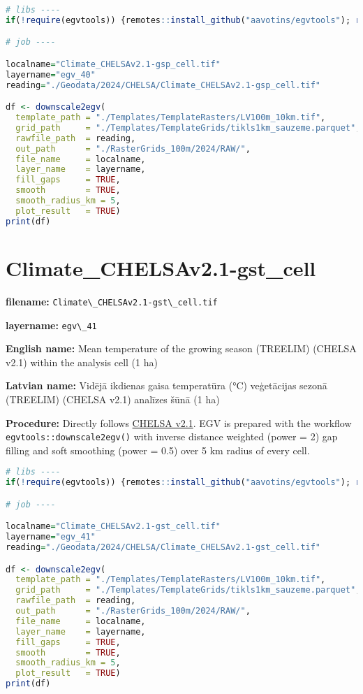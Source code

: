 \documentclass[
]{book}
\newcommand{\passthrough}[1]{#1}
\begin{document}
\begin{lstlisting}[language=R]
# libs ----
if(!require(egvtools)) {remotes::install_github("aavotins/egvtools"); require(egvtools)}

# job ----

localname="Climate_CHELSAv2.1-gsp_cell.tif"
layername="egv_40"
reading="./Geodata/2024/CHELSA/Climate_CHELSAv2.1-gsp_cell.tif"

df <- downscale2egv(
  template_path = "./Templates/TemplateRasters/LV100m_10km.tif",
  grid_path     = "./Templates/TemplateGrids/tikls1km_sauzeme.parquet",
  rawfile_path  = reading,
  out_path      = "./RasterGrids_100m/2024/RAW/",
  file_name     = localname,
  layer_name    = layername,
  fill_gaps     = TRUE,
  smooth        = TRUE,
  smooth_radius_km = 5,
  plot_result   = TRUE)
print(df)
\end{lstlisting}

\section{Climate\_CHELSAv2.1-gst\_cell}\label{ch06.041}

\textbf{filename:} \passthrough{\lstinline!Climate\_CHELSAv2.1-gst\_cell.tif!}

\textbf{layername:} \passthrough{\lstinline!egv\_41!}

\textbf{English name:} Mean temperature of the growing season (TREELIM) (CHELSA v2.1) within the analysis cell (1 ha)

\textbf{Latvian name:} Vidējā ikdienas gaisa temperatūra (°C) veģetācijas sezonā (TREELIM) (CHELSA v2.1) analīzes šūnā (1 ha)

\textbf{Procedure:} Directly follows \hyperref[Ch04.11]{CHELSA v2.1}. EGV is prepared with the
workflow \passthrough{\lstinline!egvtools::downscale2egv()!} with inverse distance weighted (power = 2)
gap filling and soft smoothing (power = 0.5) over 5 km radius of every cell.

\begin{lstlisting}[language=R]
# libs ----
if(!require(egvtools)) {remotes::install_github("aavotins/egvtools"); require(egvtools)}

# job ----

localname="Climate_CHELSAv2.1-gst_cell.tif"
layername="egv_41"
reading="./Geodata/2024/CHELSA/Climate_CHELSAv2.1-gst_cell.tif"

df <- downscale2egv(
  template_path = "./Templates/TemplateRasters/LV100m_10km.tif",
  grid_path     = "./Templates/TemplateGrids/tikls1km_sauzeme.parquet",
  rawfile_path  = reading,
  out_path      = "./RasterGrids_100m/2024/RAW/",
  file_name     = localname,
  layer_name    = layername,
  fill_gaps     = TRUE,
  smooth        = TRUE,
  smooth_radius_km = 5,
  plot_result   = TRUE)
print(df)
\end{lstlisting}
\end{document}
